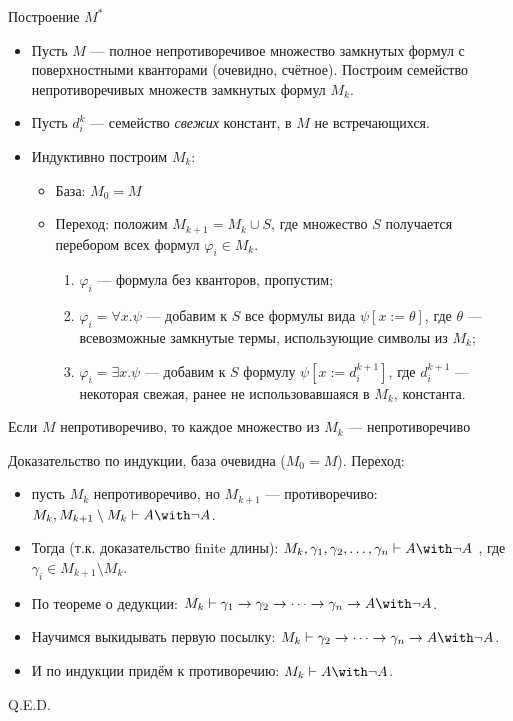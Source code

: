 Построение $M^*$

\begin{itemize}
\item Пусть $M$ --- полное непротиворечивое множество замкнутых формул с поверхностными кванторами (очевидно, счётное). 
 Построим семейство непротиворечивых множеств замкнутых формул $M_k$.
\item Пусть $d^k_i$ --- семейство \emph{свежих} констант, в $M$ не встречающихся.
\item Индуктивно построим $M_k$:
\begin{itemize}
\item База: $M_0 = M$
\item Переход: положим $M_{k+1} = M_k \cup S$, где множество $S$ получается перебором всех формул $\varphi_i \in M_k$.
\begin{enumerate}
\item $\varphi_i$ --- формула без кванторов, пропустим;
\item $\varphi_i = \forall x.\psi$ --- добавим к $S$ все формулы вида $\psi [x := \theta]$, где
$\theta$ --- всевозможные замкнутые термы, использующие символы из $M_k$;
\item $\varphi_i = \exists x.\psi$ --- добавим к $S$ формулу $\psi [x := d^{k+1}_i]$, где $d^{k+1}_i$ --- некоторая
свежая, ранее не использовавшаяся в $M_k$, константа.
\end{enumerate}
\end{itemize}
\end{itemize}

 Если $M$ непротиворечиво, то каждое множество из $M_k$ --- непротиворечиво

Доказательство по индукции, база очевидна ($M_0 = M$). 
Переход: 
\begin{itemize}
\item пусть $M_k$ непротиворечиво, но $M_{k+1}$ --- противоречиво: $M_k, M_{k+1}\setminus M_k \vdash A\with\neg A$. 
\item Тогда (т.к. доказательство finite длины):
$M_k, \gamma_1, \gamma_2, \dots,\gamma_n\vdash A\with\neg A$
, где $\gamma_i \in M_{k+1}\setminus M_k$. 
\item По теореме о дедукции: $M_k\vdash \gamma_1\to\gamma_2\to\dots\to\gamma_n\to A\with\neg A$. 
\item Научимся выкидывать первую посылку: $M_k\vdash \gamma_2\to\dots\to\gamma_n\to A\with\neg A$. 
\item И по индукции придём к противоречию: $M_k \vdash A\with\neg A$.
\end{itemize}
\hfill Q.E.D.


